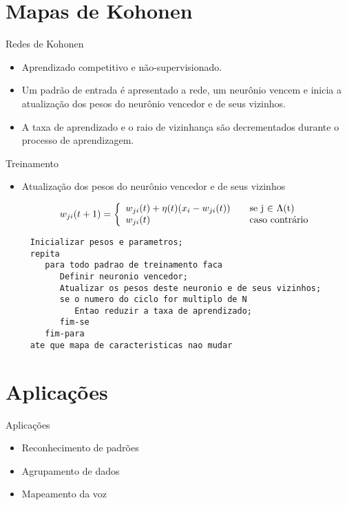 \section{Mapas de Kohonen}


\begin{frame}{Redes de Kohonen}
	\begin{itemize}
	  \item Aprendizado competitivo e não-supervisionado.
	  \item Um padrão de entrada é apresentado a rede, um neurônio vencem e inicia a atualização dos pesos do neurônio vencedor e de seus vizinhos.
	  \item A taxa de aprendizado e o raio de vizinhança são decrementados durante o processo de aprendizagem.
	\end{itemize}
\end{frame}


\begin{frame}{Treinamento}

	\begin{itemize}
	  \item Atualização dos pesos do neurônio vencedor e de seus vizinhos

\[ w_{ji}(t+1) = \left\{ 
  \begin{array}{l l}
    w_{ji}(t) + \eta(t)(x_{i}- w_{ji}(t)) & \quad \text{se j $\in$ $\Lambda$(t)}\\
    w_{ji}(t) & \quad \text{caso contrário}
  \end{array} \right.\]

	\end{itemize}
\end{frame}


\begin{lstlisting}
	 Inicializar pesos e parametros;
	 repita
	    para todo padrao de treinamento faca
	       Definir neuronio vencedor;
	       Atualizar os pesos deste neuronio e de seus vizinhos;
	       se o numero do ciclo for multiplo de N
	          Entao reduzir a taxa de aprendizado;
	       fim-se
	    fim-para
	 ate que mapa de caracteristicas nao mudar
\end{lstlisting}



\section{Aplicações}

\begin{frame}{Aplicações}
	\begin{itemize}
	  \item Reconhecimento de padrões
	  \item Agrupamento de dados
	  \item Mapeamento da voz
	\end{itemize}
\end{frame}
